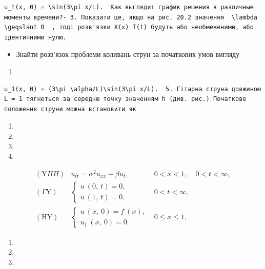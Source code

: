 \documentclass[
  ukrainian,
]{article}
\providecommand{\tightlist}{%
  \setlength{\itemsep}{0pt}\setlength{\parskip}{0pt}}
\begin{document}
\begin{verbatim}
u_t(x, 0) = \sin(3\pi x/L).  Как выглядит график решения в различные моменты времени?- 3. Показати це, якщо на рис. 20.2 значення  \lambda \geqslant 0  , тоді розв'язки X(x) T(t) будуть або необмеженими, або ідентичними нулю.
\end{verbatim}

\begin{itemize}
\tightlist
\item
  Знайти розв'язок проблеми коливань струн за початкових умов вигляду
\end{itemize}

\begin{enumerate}
\def\labelenumi{\arabic{enumi}.}
\setcounter{enumi}{11}
\tightlist
\item
\end{enumerate}

\begin{verbatim}
u_1(x, 0) = (3\pi \alpha/L)\sin(3\pi x/L).  5. Гітарна струна довжиною L = 1 тягнеться за середню точку значенням h (див. рис.) Початкове положення струни можна встановити як
\end{verbatim}

\begin{enumerate}
\def\labelenumi{\arabic{enumi}.}
\setcounter{enumi}{12}
\tightlist
\item
\item
\item
\item
\end{enumerate}

\[
\begin{array}{lll} (\mathrm{Y} \Pi \Pi) & u_{tt} = \alpha^2 u_{xx} - \beta u_t, & 0 < x < 1, & 0 < t < \infty, \\ (\Gamma \mathrm{Y}) & \begin{cases} u \ (0, \ t) = 0, \\ u \ (1, \ t) = 0, \end{cases} & 0 < t < \infty, \\ (\mathrm{H} \mathrm{Y}) & \begin{cases} u \ (x, \ 0) = f \ (x), \\ u_1 \ (x, \ 0) = 0. \end{cases} & 0 \leqslant x \leqslant 1, \end{array}
\]

\begin{enumerate}
\def\labelenumi{\arabic{enumi}.}
\setcounter{enumi}{16}
\tightlist
\item
\item
\item
\end{enumerate}
\end{document}
